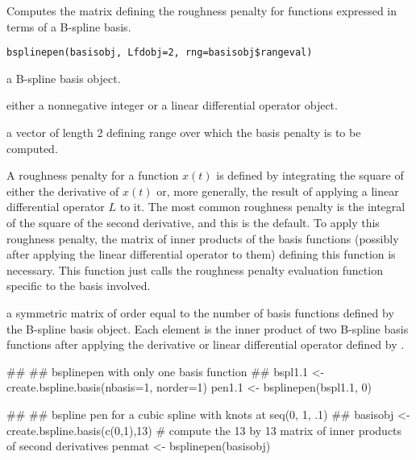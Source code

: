 \begin{Description}\relax
Computes the matrix defining the roughness penalty for functions
expressed in terms of a B-spline basis.
\end{Description}
\begin{Usage}
\begin{verbatim}
bsplinepen(basisobj, Lfdobj=2, rng=basisobj$rangeval)
\end{verbatim}
\end{Usage}
\begin{Arguments}
\begin{ldescription}
\item[\code{basisobj}] a B-spline basis object.

\item[\code{Lfdobj}] either a nonnegative integer or a linear differential operator object.

\item[\code{rng}] a vector of length 2 defining range over which the basis penalty is to
be computed.

\end{ldescription}
\end{Arguments}
\begin{Details}\relax
A roughness penalty for a function $x(t)$ is defined by
integrating the square of either the derivative of $x(t)$ or,
more generally, the result of applying a linear differential operator
$L$ to it.  The most common roughness penalty is the integral of
the square of the second derivative, and
this is the default. To apply this roughness penalty, the matrix of
inner products of the basis functions (possibly after applying the
linear differential operator to them) defining this function
is necessary. This function just calls the roughness penalty evaluation
function specific to the basis involved.
\end{Details}
\begin{Value}
a symmetric matrix of order equal to the number of basis functions
defined by the B-spline basis object.  Each element is the inner product
of two B-spline basis functions after applying the derivative or linear
differential operator defined by .
\end{Value}
\begin{Examples}
\begin{ExampleCode}
##
## bsplinepen with only one basis function
##
bspl1.1 <- create.bspline.basis(nbasis=1, norder=1)
pen1.1 <- bsplinepen(bspl1.1, 0) 

##
## bspline pen for a cubic spline with knots at seq(0, 1, .1)
##
basisobj <- create.bspline.basis(c(0,1),13)
#  compute the 13 by 13 matrix of inner products of second derivatives
penmat <- bsplinepen(basisobj)
\end{ExampleCode}
\end{Examples}

